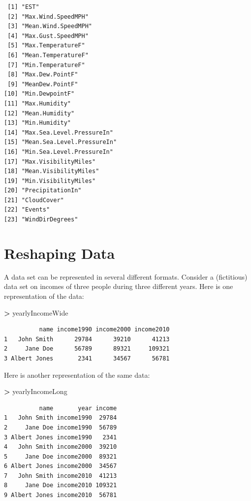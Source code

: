 \documentclass[]{krantz}
\makeatletter
\newenvironment{Shaded}{\begin{snugshade}}{\end{snugshade}}
\newcommand{\StringTok}[1]{\textcolor[rgb]{0.5,0.5,0.5}{#1}}
\newcommand{\OperatorTok}[1]{\textcolor[rgb]{0.43,0.43,0.43}{\textbf{#1}}}
\newcommand{\NormalTok}[1]{#1}
\newenvironment{kframe}{%
\medskip{}
\setlength{\fboxsep}{.8em}
 \def\at@end@of@kframe{}%
 \ifinner\ifhmode%
  \def\at@end@of@kframe{\end{minipage}}%
  \begin{minipage}{\columnwidth}%
 \fi\fi%
 \def\FrameCommand##1{\hskip\@totalleftmargin \hskip-\fboxsep
 \colorbox{shadecolor}{##1}\hskip-\fboxsep
     \hskip-\linewidth \hskip-\@totalleftmargin \hskip\columnwidth}%
 \MakeFramed {\advance\hsize-\width
   \@totalleftmargin\z@ \linewidth\hsize
   \@setminipage}}%
 {\par\unskip\endMakeFramed%
 \at@end@of@kframe}
\renewenvironment{Shaded}{\begin{kframe}}{\end{kframe}}
\makeatother
\begin{document}
\begin{verbatim}
 [1] "EST"                      
 [2] "Max.Wind.SpeedMPH"        
 [3] "Mean.Wind.SpeedMPH"       
 [4] "Max.Gust.SpeedMPH"        
 [5] "Max.TemperatureF"         
 [6] "Mean.TemperatureF"        
 [7] "Min.TemperatureF"         
 [8] "Max.Dew.PointF"           
 [9] "MeanDew.PointF"           
[10] "Min.DewpointF"            
[11] "Max.Humidity"             
[12] "Mean.Humidity"            
[13] "Min.Humidity"             
[14] "Max.Sea.Level.PressureIn" 
[15] "Mean.Sea.Level.PressureIn"
[16] "Min.Sea.Level.PressureIn" 
[17] "Max.VisibilityMiles"      
[18] "Mean.VisibilityMiles"     
[19] "Min.VisibilityMiles"      
[20] "PrecipitationIn"          
[21] "CloudCover"               
[22] "Events"                   
[23] "WindDirDegrees"           
\end{verbatim}

\section{Reshaping Data}\label{reshaping-data}

A data set can be represented in several different formats. Consider a
(fictitious) data set on incomes of three people during three different
years. Here is one representation of the data:

\begin{Shaded}
\begin{Highlighting}[]
\OperatorTok{>}\StringTok{ }\NormalTok{yearlyIncomeWide}
\end{Highlighting}
\end{Shaded}

\begin{verbatim}
          name income1990 income2000 income2010
1   John Smith      29784      39210      41213
2     Jane Doe      56789      89321     109321
3 Albert Jones       2341      34567      56781
\end{verbatim}

Here is another representation of the same data:

\begin{Shaded}
\begin{Highlighting}[]
\OperatorTok{>}\StringTok{ }\NormalTok{yearlyIncomeLong}
\end{Highlighting}
\end{Shaded}

\begin{verbatim}
          name       year income
1   John Smith income1990  29784
2     Jane Doe income1990  56789
3 Albert Jones income1990   2341
4   John Smith income2000  39210
5     Jane Doe income2000  89321
6 Albert Jones income2000  34567
7   John Smith income2010  41213
8     Jane Doe income2010 109321
9 Albert Jones income2010  56781
\end{verbatim}
\end{document}
